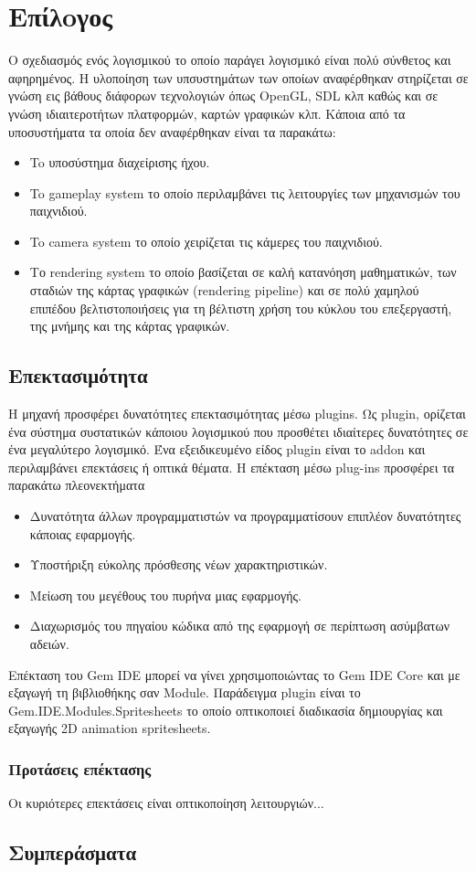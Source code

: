 \chapter{Επίλoγος}
Ο σχεδιασμός ενός λογισμικού το οποίο παράγει λογισμικό είναι πολύ σύνθετος και αφηρημένος. Η υλοποίηση των υπσυστημάτων των οποίων αναφέρθηκαν στηρίζεται σε γνώση εις βάθους διάφορων τεχνολογιών όπως \gls{OpenGL}, SDL κλπ καθώς και σε γνώση ιδιαιτεροτήτων πλατφορμών, καρτών γραφικών κλπ. Κάποια από τα υποσυστήματα τα οποία δεν αναφέρθηκαν είναι τα παρακάτω:
\begin{itemize}
	\item To υποσύστημα διαχείρισης ήχου.
	\item To gameplay system το οποίο περιλαμβάνει τις λειτουργίες των μηχανισμών του παιχνιδιού.
	\item To camera system το οποίο χειρίζεται τις κάμερες του παιχνιδιού. 
	\item Το rendering system το οποίο βασίζεται σε καλή κατανόηση μαθηματικών, των σταδιών της κάρτας γραφικών (rendering pipeline) και σε πολύ χαμηλού επιπέδου βελτιστοποιήσεις για τη βέλτιστη χρήση του κύκλου του επεξεργαστή, της μνήμης και της κάρτας γραφικών.	
\end{itemize}

\section{Επεκτασιμότητα}	
	Η μηχανή προσφέρει δυνατότητες επεκτασιμότητας μέσω plugins.
	Ως plugin, ορίζεται ένα σύστημα συστατικών κάποιου λογισμικού που προσθέτει ιδιαίτερες δυνατότητες σε ένα μεγαλύτερο λογισμικό. Ένα εξειδικευμένο είδος plugin είναι το addon και περιλαμβάνει επεκτάσεις ή οπτικά θέματα. Η επέκταση μέσω plug-ins προσφέρει τα παρακάτω πλεονεκτήματα
	\begin{itemize}
		\item Δυνατότητα άλλων προγραμματιστών να προγραμματίσουν επιπλέον δυνατότητες κάποιας εφαρμογής.
		\item Υποστήριξη εύκολης πρόσθεσης νέων χαρακτηριστικών.
		\item Μείωση του μεγέθους του πυρήνα μιας εφαρμογής.
		\item Διαχωρισμός του πηγαίου κώδικα από της εφαρμογή σε περίπτωση ασύμβατων αδειών.
	\end{itemize}
	Επέκταση του Gem IDE μπορεί να γίνει χρησιμοποιώντας το Gem IDE Core και με εξαγωγή τη βιβλιοθήκης σαν Module. Παράδειγμα plugin είναι το Gem.IDE.Modules.Spritesheets το οποίο οπτικοποιεί διαδικασία δημιουργίας και εξαγωγής 2D animation spritesheets.	
	
	\subsection{Προτάσεις επέκτασης}
	Οι κυριότερες επεκτάσεις είναι οπτικοποίηση λειτουργιών...
	
\section{Συμπεράσματα}

